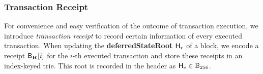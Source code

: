\oldversion{
\begin{align*}
	\block\equiv \left(\block_\head, \block_\txs, \block_\ommers \right)
\end{align*}
}


\subsubsection{Transaction Receipt}

For convenience and easy verification of the outcome of transaction execution, 
we introduce \emph{transaction receipt} to record certain information of every executed transaction.
When updating the {\bf deferredStateRoot} $\textsf{H}_r$ of a block,
we encode a receipt $\textsf{B}_{\mathbf{R}}[i]$ for the $i$-th executed transaction
and store these receipts in an index-keyed trie.
This root is recorded in the header as $\textsf{H}_e\in\mathbb{B}_{256}$.


